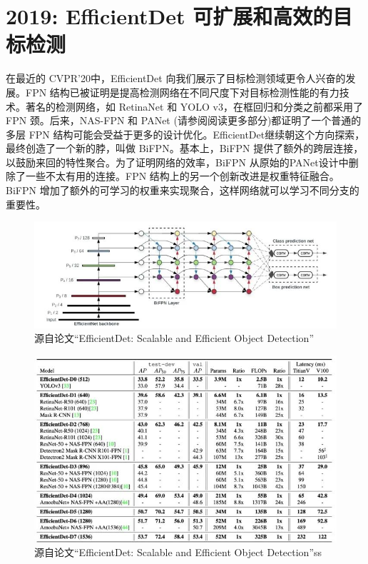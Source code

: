 \documentclass{article}
\begin{document}
	\section{2019: EfficientDet 可扩展和高效的目标检测}
	
	在最近的 CVPR’20中，EfficientDet 向我们展示了目标检测领域更令人兴奋的发展。FPN 结构已被证明是提高检测网络在不同尺度下对目标检测性能的有力技术。著名的检测网络，如 RetinaNet 和 YOLO v3，在框回归和分类之前都采用了 FPN 颈。后来，NAS-FPN 和 PANet (请参阅阅读更多部分)都证明了一个普通的多层 FPN 结构可能会受益于更多的设计优化。EfficientDet继续朝这个方向探索，最终创造了一个新的脖，叫做 BiFPN。基本上，BiFPN 提供了额外的跨层连接，以鼓励来回的特性聚合。为了证明网络的效率，BiFPN 从原始的PANet设计中删除了一些不太有用的连接。FPN 结构上的另一个创新改进是权重特征融合。BiFPN 增加了额外的可学习的权重来实现聚合，这样网络就可以学习不同分支的重要性。
	
	\begin{figure}[htpb]
		\centering
		\includegraphics[width=\linewidth]{detectfig/15.jpg}
		\caption{源自论文“EfficientDet: Scalable and Efficient Object Detection”}
	\end{figure}
\begin{figure}[htpb]
	\centering
	\includegraphics[width=\linewidth]{detectfig/16.jpg}
	\caption{源自论文“EfficientDet: Scalable and Efficient Object Detection”ss}
\end{figure}
	
\end{document}
